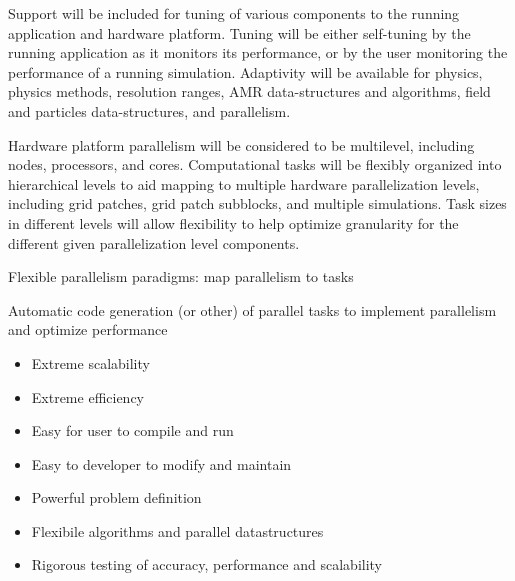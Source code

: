 
   Support will be included for tuning of various components to the
   running application and hardware platform.  Tuning will be either
   self-tuning by the running application as it monitors its
   performance, or by the user monitoring the performance of a running
   simulation.  Adaptivity will be available for physics, physics
   methods, resolution ranges, AMR data-structures and algorithms,
   field and particles data-structures, and parallelism.

Hardware platform parallelism will be considered to be multilevel,
including nodes, processors, and cores.  Computational tasks will be
flexibly organized into hierarchical levels to aid mapping to multiple
hardware parallelization levels, including grid patches, grid patch
subblocks, and multiple simulations.  Task sizes in different levels
will allow flexibility to help optimize granularity for the different
given parallelization level components.

Flexible parallelism paradigms: map parallelism to tasks

Automatic code generation (or other) of parallel tasks to implement
parallelism and optimize performance

\begin{itemize}
\item Extreme scalability
\item Extreme efficiency
\item Easy for user to compile and run
\item Easy to developer to modify and maintain
\item Powerful problem definition
\item Flexibile algorithms and parallel datastructures
\item Rigorous testing of accuracy, performance and scalability
\end{itemize}
